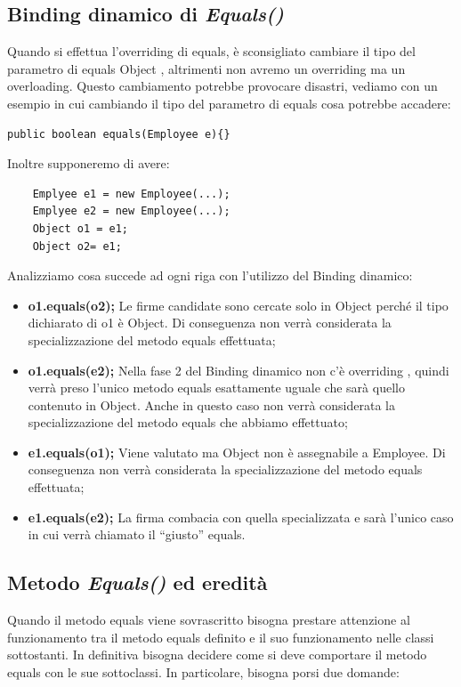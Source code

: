 \subsection{Binding dinamico di \textit{Equals()}}
Quando si effettua l’overriding di equals, è sconsigliato cambiare il tipo del parametro di equals Object , altrimenti non avremo un overriding ma un overloading. Questo cambiamento potrebbe provocare disastri, vediamo con un esempio in cui cambiando il tipo del parametro di equals cosa potrebbe accadere:
\begin{lstlisting}
public boolean equals(Employee e){}
\end{lstlisting}
Inoltre supponeremo di avere:
\begin{lstlisting}
	Emplyee e1 = new Employee(...);
  	Emplyee e2 = new Employee(...);
  	Object o1 = e1;
  	Object o2= e1;
\end{lstlisting}
 Analizziamo cosa succede ad ogni riga con l’utilizzo del Binding dinamico:
\begin{itemize}
\item \textbf{o1.equals(o2);} Le firme candidate sono cercate solo in Object perché il tipo dichiarato di o1 è Object. Di conseguenza non verrà considerata la specializzazione del metodo equals effettuata;
\item \textbf{o1.equals(e2);} Nella fase 2 del Binding dinamico non c’è overriding , quindi verrà preso l’unico metodo equals esattamente uguale che sarà quello contenuto in Object. Anche in questo caso non verrà considerata la specializzazione del metodo equals che abbiamo effettuato;
\item \textbf{e1.equals(o1);} Viene valutato ma Object non è assegnabile a Employee. Di conseguenza non verrà considerata la specializzazione del metodo equals effettuata;
\item \textbf{e1.equals(e2);} La firma combacia con quella specializzata e sarà l’unico caso in cui verrà chiamato il “giusto” equals.
\end{itemize}

\subsection{Metodo \textit{Equals()} ed eredità}
Quando il metodo equals viene sovrascritto bisogna prestare attenzione al funzionamento tra il metodo equals definito e il suo funzionamento nelle classi sottostanti. In definitiva bisogna decidere come si deve comportare il metodo equals con le sue sottoclassi. In particolare, bisogna porsi due domande:

